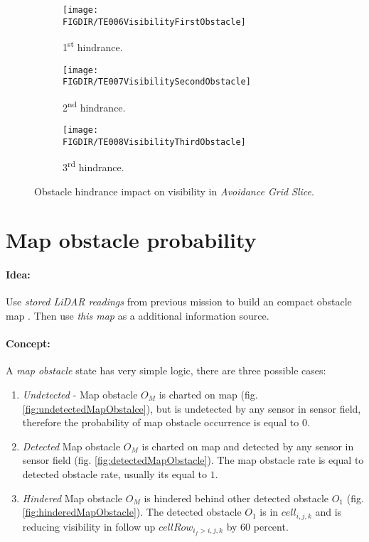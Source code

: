 \begin{figure}[H]
    \centering
    \begin{subfigure}{0.32\textwidth}
        \texttt{[image: \\FIGDIR/TE006VisibilityFirstObstacle]} 
        \caption{1\textsuperscript{st} hindrance.}
        \label{fig:fistObstacleHindrance}
    \end{subfigure}
    \begin{subfigure}{0.32\textwidth}
        \texttt{[image: \\FIGDIR/TE007VisibilitySecondObstacle]} 
        \caption{2\textsuperscript{nd} hindrance.}
        \label{fig:secondObstacleHindrance}
    \end{subfigure}
    \begin{subfigure}{0.32\textwidth}
        \texttt{[image: \\FIGDIR/TE008VisibilityThirdObstacle]} 
        \caption{3\textsuperscript{rd} hindrance.}
        \label{fig:thirdObstacleHindrance}
    \end{subfigure}
    \caption{Obstacle hindrance impact on visibility in \emph{Avoidance Grid Slice}.}
    \label{fig:hindranceImpactOnVisibility}
\end{figure}


\section{Map obstacle probability}\label{sec:mapObstacleProbability}
\paragraph{Idea:} Use \emph{stored LiDAR readings} from previous mission to build an compact obstacle map \cite{cernamaria2018}. Then use \emph{this map} as a additional information source.

\paragraph{Concept:} A \emph{map obstacle} state has very simple logic, there are three possible cases:

\begin{enumerate}
    \item \emph{Undetected} - Map obstacle $O_M$ is charted on map (fig. \ref{fig:undetectedMapObstalce}), but is undetected by any sensor in sensor field, therefore the probability of map obstacle occurrence is equal to $0$.


    \item \emph{Detected} Map obstacle $O_M$ is charted on map and detected by any sensor in sensor field (fig. \ref{fig:detectedMapObstacle}). The map obstacle rate is equal to detected obstacle rate, usually its equal to $1$.

    \item \emph{Hindered} Map obstacle $O_M$ is hindered behind other detected obstacle $O_1$ (fig. \ref{fig:hinderedMapObstacle}). The detected obstacle $O_1$ is in $cell_{i,j,k}$ and is reducing visibility in follow up $cellRow_{i_f>i,j,k}$ by $60$ percent.
\end{enumerate}

